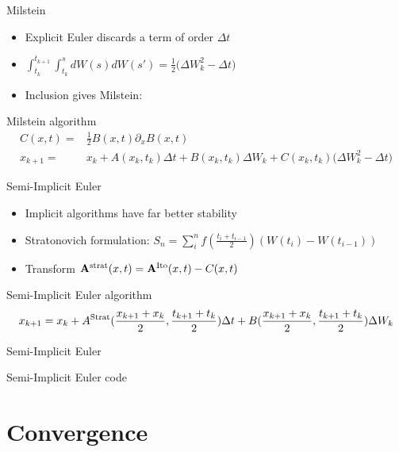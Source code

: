\documentclass[]{beamer}
\newcommand {\be}{\begin{equation*}}
\newcommand {\ee}{\end{equation*}}
\begin{document}
\begin{frame}{Milstein}
\begin{itemize}
  \setlength\itemsep{1em}
 \item Explicit Euler  discards a term of order $\Delta t$
\item $\int_{t_k}^{t_{k+1}} \int_{t_k}^s dW(s)dW(s')=\frac{1}{2}\big(\Delta W_k^2-\Delta t\big)$
\item Inclusion gives Milstein:
\end{itemize}
\begin{block}{Milstein algorithm}
\begin{align}
C(x, t)=&\frac{1}{2}B(x,t)\partial_x B(x, t) \nonumber  \\
 x_{k+1} =& x_{k} + A(x_k, t_k)\Delta t +B(x_k, t_k) \Delta W_k+C(x_k, t_k) \big(\Delta W_k^2-\Delta t\big) \nonumber
\end{align}
\end{block}

\end{frame}

\begin{frame}{Semi-Implicit Euler}
\begin{itemize}
  \setlength\itemsep{1em}
 \item Implicit algorithms have far better stability
\item Stratonovich formulation: $S_n=\sum_i^n f(\frac{t_i +t_{i-1}}{2})\left(W(t_i)-W(t_{i-1})\right)$
\item Transform  $\mathbf{A}^{\rm strat}(x, t)=\mathbf{A}^{\rm Ito}(x,t)-C(x, t)$
\end{itemize}
\begin{block}{Semi-Implicit Euler algorithm}
\be
x_{k+1} = x_{k} + A^{\rm Strat}(\frac{x_{k+1}+x_k}{2},\frac{t_{k+1}+t_k}{2} )\Delta t +
B(\frac{x_{k+1}+x_k}{2}, \frac{t_{k+1}+t_k}{2}) \Delta W_k 
\ee
\end{block}
\end{frame}


\begin{frame}{Semi-Implicit Euler}

\begin{block}{Semi-Implicit Euler code}


\end{block}
\end{frame}

\section{Convergence}
\end{document}
